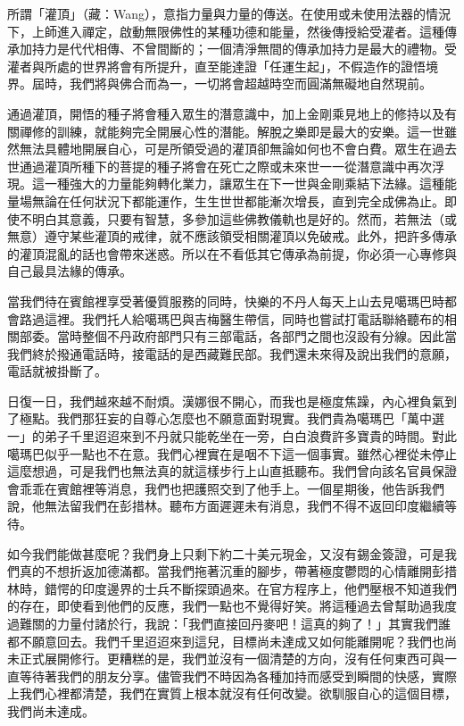 
所謂「灌頂」（藏：Wang），意指力量與力量的傳送。在使用或未使用法器的情況下，上師進入禪定，啟動無限佛性的某種功德和能量，然後傳授給受灌者。這種傳承加持力是代代相傳、不曾間斷的；一個清淨無間的傳承加持力是最大的禮物。受灌者與所處的世界將會有所提升，直至能達證「任運生起」，不假造作的證悟境界。屆時，我們將與佛合而為一，一切將會超越時空而圓滿無礙地自然現前。

通過灌頂，開悟的種子將會種入眾生的潛意識中，加上金剛乘見地上的修持以及有關禪修的訓練，就能夠完全開展心性的潛能。解脫之樂即是最大的安樂。這一世雖然無法具體地開展自心，可是所領受過的灌頂卻無論如何也不會白費。眾生在過去世通過灌頂所種下的菩提的種子將會在死亡之際或未來世一一從潛意識中再次浮現。這一種強大的力量能夠轉化業力，讓眾生在下一世與金剛乘結下法緣。這種能量場無論在任何狀況下都能運作，生生世世都能漸次增長，直到完全成佛為止。即使不明白其意義，只要有智慧，多參加這些佛教儀軌也是好的。然而，若無法（或無意）遵守某些灌頂的戒律，就不應該領受相關灌頂以免破戒。此外，把許多傳承的灌頂混亂的話也會帶來迷惑。所以在不看低其它傳承為前提，你必須一心專修與自己最具法緣的傳承。

當我們待在賓館裡享受著優質服務的同時，快樂的不丹人每天上山去見噶瑪巴時都會路過這裡。我們托人給噶瑪巴與吉梅醫生帶信，同時也嘗試打電話聯絡聽布的相關部委。當時整個不丹政府部門只有三部電話，各部門之間也沒設有分線。因此當我們終於撥通電話時，接電話的是西藏難民部。我們還未來得及說出我們的意願，電話就被掛斷了。

日復一日，我們越來越不耐煩。漢娜很不開心，而我也是極度焦躁，內心裡負氣到了極點。我們那狂妄的自尊心怎麼也不願意面對現實。我們貴為噶瑪巴「萬中選一」的弟子千里迢迢來到不丹就只能乾坐在一旁，白白浪費許多寶貴的時間。對此噶瑪巴似乎一點也不在意。我們心裡實在是咽不下這一個事實。雖然心裡從未停止這麼想過，可是我們也無法真的就這樣步行上山直抵聽布。我們曾向該名官員保證會乖乖在賓館裡等消息，我們也把護照交到了他手上。一個星期後，他告訴我們說，他無法留我們在彭措林。聽布方面遲遲未有消息，我們不得不返回印度繼續等待。

如今我們能做甚麼呢？我們身上只剩下約二十美元現金，又沒有錫金簽證，可是我們真的不想折返加德滿都。當我們拖著沉重的腳步，帶著極度鬱悶的心情離開彭措林時，錯愕的印度邊界的士兵不斷探頭過來。在官方程序上，他們壓根不知道我們的存在，即使看到他們的反應，我們一點也不覺得好笑。將這種過去曾幫助過我度過難關的力量付諸於行，我說：「我們直接回丹麥吧！這真的夠了！」其實我們誰都不願意回去。我們千里迢迢來到這兒，目標尚未達成又如何能離開呢？我們也尚未正式展開修行。更糟糕的是，我們並沒有一個清楚的方向，沒有任何東西可與一直等待著我們的朋友分享。儘管我們不時因為各種加持而感受到瞬間的快感，實際上我們心裡都清楚，我們在實質上根本就沒有任何改變。欲馴服自心的這個目標，我們尚未達成。

